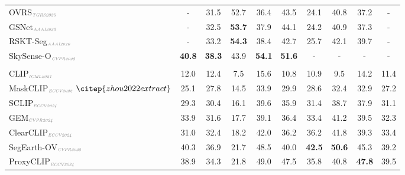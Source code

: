 \documentclass[twocolumn,switch,times]{article}
\begin{document}
\begin{table}
{\begin{tabular}{@{}lcccccccc|c@{}}
    OVRS$_{\textcolor{gray}{\text{\tiny\textit{TGRS2025}}}}$~\citep{cao2024open} & - & 31.5 & 52.7 & 36.4 & 43.5 & 24.1 & 40.8 & 37.2 & - \\
    GSNet$_{\textcolor{gray}{\text{\tiny\textit{AAAI2025}}}}$~\citep{ye2025towards} & - & 32.5 & \textcolor{tabblue}{\textbf{53.7}} & 37.9 & 44.1 & 24.2 & 40.9 & 37.3 & - \\
    RSKT-Seg$_{\textcolor{gray}{\text{\tiny\textit{AAAI2026}}}}$~\citep{li2025exploring} & - & 33.2 & \textcolor{tabred}{\textbf{54.3}} & 38.4 & 42.7 & 25.7 & 42.1 & 39.7 & - \\
    SkySense-O$_{\textcolor{gray}{\text{\tiny\textit{CVPR2025}}}}$~\citep{zhu2025skysense} & \textcolor{tabblue}{\textbf{40.8}} & \textcolor{tabblue}{\textbf{38.3}} & 43.9 & \textcolor{tabblue}{\textbf{54.1}} & \textcolor{tabblue}{\textbf{51.6}} & - & - & - & - \\
    \midrule
    \rowcolor{ForestGreen!8}
    \multicolumn{10}{c}{\textbf{\emph{Training-free}}}   \\ 
    CLIP$_{\textcolor{gray}{\text{\tiny \textit{ICML2021}}}}$~\citep{radford2021learning} & 12.0 & 12.4 & 7.5 & 15.6 & 10.8 & 10.9 & 9.5 & 14.2 & 11.4 \\
    MaskCLIP$_{\textcolor{gray}{\text{\tiny \textit{ECCV2022}}}}~\citep{zhou2022extract}$ & 25.1 & 27.8 & 14.5 & 33.9 & 29.9 & 28.6 & 32.4 & 32.9 & 27.2 \\
    SCLIP$_{\textcolor{gray}{\text{\tiny \textit{ECCV2024}}}}$~\citep{wang2023sclip} & 29.3 & 30.4 & 16.1 & 39.6 & 35.9 & 31.4 & 38.7 & 37.9 & 31.1 \\
    GEM$_{\textcolor{gray}{\text{\tiny \textit{CVPR2024}}}}$~\citep{bousselham2024grounding} & 33.9 & 31.6 & 17.7 & 39.1 & 36.4 & 33.4 & 41.2 & 39.5 & 32.3 \\
    ClearCLIP$_{\textcolor{gray}{\text{\tiny \textit{ECCV2024}}}}$~\citep{lan2024clearclip} & 31.0 & 32.4 & 18.2 & 42.0 & 36.2 & 36.2 & 41.8 & 39.3 & 33.4 \\
    SegEarth-OV$_{\textcolor{gray}{\text{\tiny \textit{CVPR2025}}}}$~\citep{li2025segearth} & 40.3 & 36.9 & 21.7 & 48.5 & 40.0 & \textcolor{tabblue}{\textbf{42.5}} & \textcolor{tabblue}{\textbf{50.6}} & 45.3 & 39.2 \\
    ProxyCLIP$_{\textcolor{gray}{\text{\tiny \textit{ECCV2024}}}}$~\citep{lan2025proxyclip} & 38.9 & 34.3 & 21.8 & 49.0 & 47.5 & 35.8 & 40.8 & \textcolor{tabblue}{\textbf{47.8}} & 39.5 \\

\end{tabular}}
\end{table}
\end{document}
